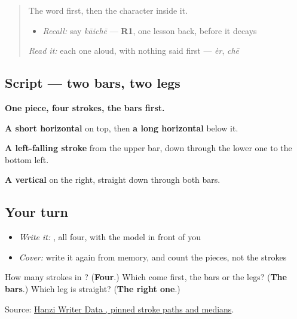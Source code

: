 \begin{quote}
The word first, then the character inside it.

\begin{itemize}
\raggedright
  \item \emph{Recall:} say \emph{kāichē} — \textbf{R1}, one lesson back, before it decays
\end{itemize}

\begin{quote}
 
\end{quote}

\emph{Read it:} each one aloud, with nothing said first — \emph{èr}, \emph{chē}
\end{quote}

\subsection*{Script — two bars, two legs}

\begin{quote}
\end{quote}

\textbf{One piece, four strokes, the bars first.}

\textbf{A short horizontal} on top, then \textbf{a long horizontal} below it.

\textbf{A left-falling stroke} from the upper bar, down through the lower one to the bottom left.

\textbf{A vertical} on the right, straight down through both bars.

\subsection*{Your turn}
\begin{itemize}
\raggedright
  \item \emph{Write it:} , all four, with the model in front of you
  \item \emph{Cover:} write it again from memory, and count the pieces, not the strokes
\end{itemize}

\begin{tcolorbox}[breakable,colback=teal!4,colframe=teal!35!black,title={Before you move on}]
How many strokes in ? (\textbf{Four}.) Which come first, the bars or the legs? (\textbf{The bars}.) Which leg is straight? (\textbf{The right one}.)

Source: \href{https://raw.githubusercontent.com/chanind/hanzi-writer-data/68d10a4b21150cae5e1ebbd223eed289cf32d90c/data/\%E5\%BC\%80.json}{Hanzi Writer Data , pinned stroke paths and medians}.
\end{tcolorbox}
